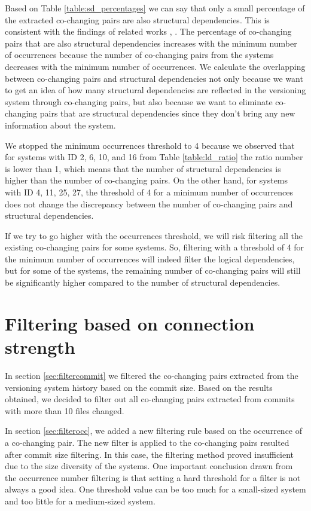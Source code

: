 Based on Table \ref{table:sd_percentages} we can say that only a small percentage of the extracted co-changing pairs are also structural dependencies. This is consistent with the findings of related works \cite{DBLP:journals/jss/AjienkaC17}, \cite{DBLP:journals/ese/AjienkaCC18}. 
The percentage of co-changing pairs that are also structural dependencies increases with the minimum number of occurrences because the number of co-changing pairs from the systems decreases with the minimum number of occurrences. 
We calculate the overlapping between co-changing pairs and structural dependencies not only because we want to get an idea of how many structural dependencies are reflected in the versioning system through co-changing pairs, but also because we want to eliminate co-changing pairs that are structural dependencies since they don't bring any new information about the system.

We stopped the minimum occurrences threshold to 4 because we observed that for systems with ID 2, 6, 10, and 16 from Table \ref{table:ld_ratio} the ratio number is lower than 1, which means that the number of structural dependencies is higher than the number of co-changing pairs. On the other hand, for systems with ID 4, 11, 25, 27, the threshold of 4 for a minimum number of occurrences does not change the discrepancy between the number of co-changing pairs and structural dependencies.

If we try to go higher with the occurrences threshold, we will risk filtering all the existing co-changing pairs for some systems.
So, filtering with a threshold of 4 for the minimum number of occurrences will indeed filter the logical dependencies, but for some of the systems, the remaining number of co-changing pairs will still be significantly higher compared to the number of structural dependencies.




\section{Filtering based on connection strength}
\label{sec:filterstrength}

In section \ref{sec:filtercommit} we filtered the co-changing pairs extracted from the versioning system history based on the commit size. Based on the results obtained, we decided to filter out all co-changing pairs extracted from commits with more than 10 files changed. 

In section \ref{sec:filterocc}, we added a new filtering rule based on the occurrence of a co-changing pair. The new filter is applied to the co-changing pairs resulted after commit size filtering. In this case, the filtering method proved insufficient due to the size diversity of the systems. One important conclusion drawn from the occurrence number filtering is that setting a hard threshold for a filter is not always a good idea. One threshold value can be too much for a small-sized system and too little for a medium-sized system. 

